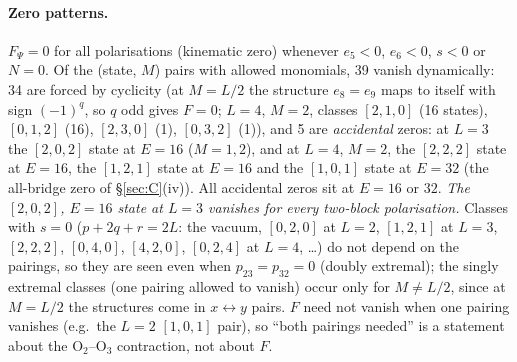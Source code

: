 \paragraph{Zero patterns.} $F_\Psi=0$ for all polarisations (kinematic zero) whenever $e_5<0$, $e_6<0$, $s<0$ or $N=0$. Of the (state, $M$) pairs with allowed monomials, 39 vanish dynamically: 34 are forced by cyclicity (at $M=L/2$ the structure $e_8=e_9$
maps to itself with sign $(-1)^q$, so $q$ odd gives $F=0$; $L=4$, $M=2$, classes $[2,1,0]$ (16 states), $[0,1,2]$ (16), $[2,3,0]$ (1), $[0,3,2]$ (1)), and 5 are \emph{accidental} zeros: at $L=3$ the $[2,0,2]$ state at $E=16$ ($M=1,2$), and at $L=4$,
$M=2$, the $[2,2,2]$ state at $E=16$, the $[1,2,1]$ state at $E=16$ and the $[1,0,1]$ state at $E=32$ (the all-bridge zero of \S\ref{sec:C}(iv)). All accidental zeros sit at $E=16$ or $32$. \emph{The $[2,0,2]$, $E=16$ state at $L=3$ vanishes for every two-block polarisation.}
Classes with $s=0$ ($p+2q+r=2L$: the vacuum, $[0,2,0]$ at $L=2$, $[1,2,1]$ at $L=3$, $[2,2,2]$, $[0,4,0]$, $[4,2,0]$, $[0,2,4]$ at $L=4$, \dots) do not depend on the pairings, so they are seen even when $p_{23}=p_{32}=0$ (doubly extremal);
the singly extremal classes (one pairing allowed to vanish) occur only for $M\ne L/2$, since at $M=L/2$ the structures come in $x\leftrightarrow y$ pairs. $F$ need not vanish when one pairing vanishes (e.g.\ the $L=2$ $[1,0,1]$ pair), so ``both pairings needed'' is a
statement about the O$_2$--O$_3$ contraction, not about $F$.

